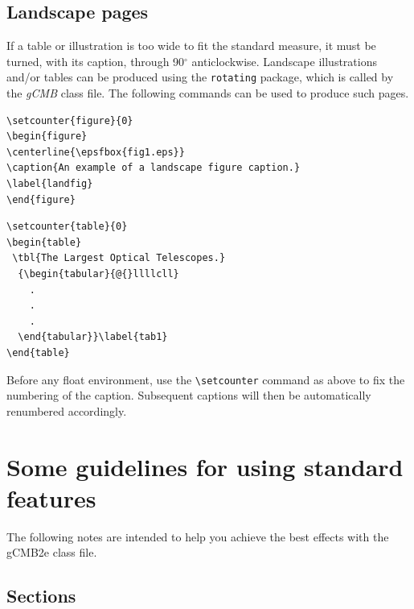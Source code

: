 \documentclass{gCMB2e}
\begin{document}
\subsection{Landscape pages}\label{eps}

If a table or illustration is too wide to fit the standard measure, it must be turned, with its caption,
through 90$^{\circ}$ anticlockwise. Landscape illustrations and/or tables can be produced using
the \verb"rotating" package, which is called by the \textit{gCMB} class file. The following commands can
be used to produce such pages.
%
\begin{verbatim}
\setcounter{figure}{0}
\begin{figure}
\centerline{\epsfbox{fig1.eps}}
\caption{An example of a landscape figure caption.}
\label{landfig}
\end{figure}
\end{verbatim}

\begin{verbatim}
\setcounter{table}{0}
\begin{table}
 \tbl{The Largest Optical Telescopes.}
  {\begin{tabular}{@{}llllcll}
    .
    .
    .
  \end{tabular}}\label{tab1}
\end{table}
\end{verbatim}
%
Before any float environment, use the \verb"\setcounter" command
as above to fix the numbering of the caption. Subsequent captions
will then be automatically renumbered accordingly.


\section{Some guidelines for using standard features}

The following notes are intended to help you achieve the best effects with the gCMB2e class file.


\subsection{Sections}
\end{document}
